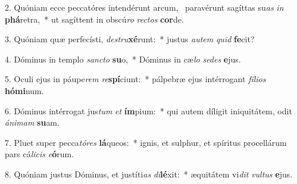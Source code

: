 2. Quóniam ecce peccatóres intendérunt arcum, \dag\  paravérunt sagíttas su\textit{as} \textit{in} \textbf{phá}retra,~*  ut sagíttent in obscú\textit{ro} \textit{rec}\textit{tos} \textbf{cor}de.\

3. Quóniam quæ perfecísti, \textit{de}\textit{stru}\textbf{xé}runt:~*  justus \textit{au}\textit{tem} \textit{quid} \textbf{fe}cit?\

4. Dóminus in templo \textit{sanc}\textit{to} \textbf{su}o,~*  Dóminus in cæ\textit{lo} \textit{se}\textit{des} \textbf{e}jus.\

5. Oculi ejus in páupe\textit{rem} \textit{re}\textbf{spí}ciunt:~*  pálpebræ ejus intérrogant \textit{fí}\textit{li}\textit{os} \textbf{hó}\textbf{mi}num.\

6. Dóminus intérrogat jus\textit{tum} \textit{et} \textbf{ím}pium:~*  qui autem díligit iniquitátem, odit \textit{á}\textit{ni}\textit{mam} \textbf{su}am.\

7. Pluet super pecca\textit{tó}\textit{res} \textbf{lá}queos:~*  ignis, et sulphur, et spíritus procellárum pars cá\textit{li}\textit{cis} \textit{e}\textbf{ó}rum.\

8. Quóniam justus Dóminus, et justíti\textit{as} \textit{di}\textbf{lé}xit:~*  æquitátem vi\textit{dit} \textit{vul}\textit{tus} \textbf{e}jus.\


